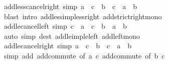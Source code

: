 \begin{isabellebody}
\endisatagproof
{\isafoldproof}%
%
\isadelimproof
\isanewline
%
\endisadelimproof
\isanewline
{}\isamarkupfalse%
\ add{\isacharunderscore}{\kern0pt}less{\isacharunderscore}{\kern0pt}cancel{\isacharunderscore}{\kern0pt}right\ {\isacharbrackleft}{\kern0pt}simp{\isacharbrackright}{\kern0pt}{\isacharcolon}{\kern0pt}\ {\isachardoublequoteopen}a\ {\isacharplus}{\kern0pt}\ c\ {\isacharless}{\kern0pt}\ b\ {\isacharplus}{\kern0pt}\ c\ {\isasymlongleftrightarrow}\ a\ {\isacharless}{\kern0pt}\ b{\isachardoublequoteclose}\isanewline
%
\isadelimproof
\ \ %
\endisadelimproof
%
\isatagproof
{}\isamarkupfalse%
\ {\isacharparenleft}{\kern0pt}blast\ intro{\isacharcolon}{\kern0pt}\ add{\isacharunderscore}{\kern0pt}less{\isacharunderscore}{\kern0pt}imp{\isacharunderscore}{\kern0pt}less{\isacharunderscore}{\kern0pt}right\ add{\isacharunderscore}{\kern0pt}strict{\isacharunderscore}{\kern0pt}right{\isacharunderscore}{\kern0pt}mono{\isacharparenright}{\kern0pt}%
\endisatagproof
{\isafoldproof}%
%
\isadelimproof
\isanewline
%
\endisadelimproof
\isanewline
{}\isamarkupfalse%
\ add{\isacharunderscore}{\kern0pt}le{\isacharunderscore}{\kern0pt}cancel{\isacharunderscore}{\kern0pt}left\ {\isacharbrackleft}{\kern0pt}simp{\isacharbrackright}{\kern0pt}{\isacharcolon}{\kern0pt}\ {\isachardoublequoteopen}c\ {\isacharplus}{\kern0pt}\ a\ {\isasymle}\ c\ {\isacharplus}{\kern0pt}\ b\ {\isasymlongleftrightarrow}\ a\ {\isasymle}\ b{\isachardoublequoteclose}\isanewline
%
\isadelimproof
\ \ %
\endisadelimproof
%
\isatagproof
{}\isamarkupfalse%
\ {\isacharparenleft}{\kern0pt}auto\ simp{\isacharcolon}{\kern0pt}\ dest{\isacharcolon}{\kern0pt}\ add{\isacharunderscore}{\kern0pt}le{\isacharunderscore}{\kern0pt}imp{\isacharunderscore}{\kern0pt}le{\isacharunderscore}{\kern0pt}left\ add{\isacharunderscore}{\kern0pt}left{\isacharunderscore}{\kern0pt}mono{\isacharparenright}{\kern0pt}%
\endisatagproof
{\isafoldproof}%
%
\isadelimproof
\isanewline
%
\endisadelimproof
\isanewline
{}\isamarkupfalse%
\ add{\isacharunderscore}{\kern0pt}le{\isacharunderscore}{\kern0pt}cancel{\isacharunderscore}{\kern0pt}right\ {\isacharbrackleft}{\kern0pt}simp{\isacharbrackright}{\kern0pt}{\isacharcolon}{\kern0pt}\ {\isachardoublequoteopen}a\ {\isacharplus}{\kern0pt}\ c\ {\isasymle}\ b\ {\isacharplus}{\kern0pt}\ c\ {\isasymlongleftrightarrow}\ a\ {\isasymle}\ b{\isachardoublequoteclose}\isanewline
%
\isadelimproof
\ \ %
\endisadelimproof
%
\isatagproof
{}\isamarkupfalse%
\ {\isacharparenleft}{\kern0pt}simp\ add{\isacharcolon}{\kern0pt}\ add{\isachardot}{\kern0pt}commute\ {\isacharbrackleft}{\kern0pt}of\ a\ c{\isacharbrackright}{\kern0pt}\ add{\isachardot}{\kern0pt}commute\ {\isacharbrackleft}{\kern0pt}of\ b\ c{\isacharbrackright}{\kern0pt}{\isacharparenright}{\kern0pt}%

\end{isabellebody}
